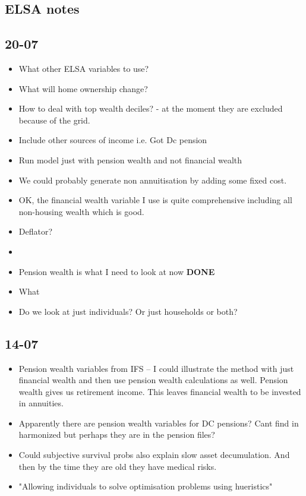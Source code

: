 \documentclass[12pt]{article}
\begin{document}
\subsection{ELSA notes}
\subsection{\textbf{20-07}}
\begin{itemize}
      \item What other ELSA variables to use?
      \item What will home ownership change?
      \item How to deal with top wealth deciles? - at the moment they are excluded because of the grid.
      \item Include other sources of income i.e. Got Dc pension
      \item Run model just with pension wealth and not financial wealth
      \item We could probably generate non annuitisation by adding some fixed cost.
      \item OK, the financial wealth variable I use is quite comprehensive including all non-housing
            wealth which is good.
      \item Deflator?
      \item

      \item Pension wealth is what I need to look at now \textbf{DONE}
      \item What
      \item Do we look at just individuals? Or just households or both?
\end{itemize}

\subsection{\textbf{14-07}}
\begin{itemize}
      \item Pension wealth variables from IFS -- I could illustrate
            the method with just financial wealth and then use pension wealth calculations
            as well. Pension wealth gives us retirement income. This leaves financial wealth to be
            invested in annuities.

      \item Apparently there are pension wealth variables for DC pensions?
            Cant find in harmonized but perhaps they are in the pension files?

      \item Could subjective survival probs also explain slow asset decumulation. And then by the time they are old
            they have medical risks.

      \item "Allowing individuals to solve optimisation problems using hueristics"
\end{itemize}
\end{document}
